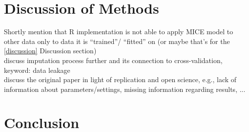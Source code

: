 \section{Discussion of Methods}
\begin{changemargin}{50pt}{50pt}
Shortly mention that R implementation is not able to apply MICE model to other 
data only to data it is ``trained''/ ``fitted'' on (or maybe that's for the 
\ref{discussion} Discussion section)
\\
discuss imputation process further and its connection to cross-validation, 
keyword: data leakage
\\
discuss the original paper in light of replication and open science, e.g., lack 
of information about parameters/settings, missing information regarding 
results, ...
\end{changemargin}
\section{Conclusion}
